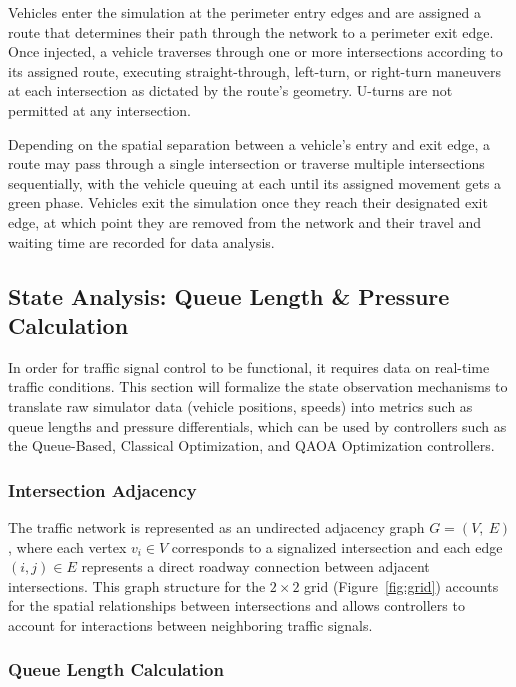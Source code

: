 \documentclass[12pt]{article}
\begin{document}
Vehicles enter the simulation at the perimeter entry edges and are assigned a route that determines their path through the network to a perimeter exit edge. Once injected, a vehicle traverses through one or more intersections according to its assigned route, executing straight-through, left-turn, or right-turn maneuvers at each intersection as dictated by the route's geometry. U-turns are not permitted at any intersection.

Depending on the spatial separation between a vehicle's entry and exit edge, a route may pass through a single intersection or traverse multiple intersections sequentially, with the vehicle queuing at each until its assigned movement gets a green phase. Vehicles exit the simulation once they reach their designated exit edge, at which point they are removed from the network and their travel and waiting time are recorded for data analysis.

\subsection{State Analysis: Queue Length \& Pressure Calculation}

In order for traffic signal control to be functional, it requires data on real-time traffic conditions. This section will formalize the state observation mechanisms to translate raw simulator data (vehicle positions, speeds) into metrics such as queue lengths and pressure differentials, which can be used by controllers such as the Queue-Based, Classical Optimization, and QAOA Optimization controllers.

\subsubsection{Intersection Adjacency}

The traffic network is represented as an undirected adjacency graph \(G = (V,\ E)\), where each vertex \(v_{i} \in V\) corresponds to a signalized intersection and each edge \((i,j) \in E\) represents a direct roadway connection between adjacent intersections. This graph structure for the $2 \times 2$ grid (Figure~\ref{fig:grid}) accounts for the spatial relationships between intersections and allows controllers to account for interactions between neighboring traffic signals.

\subsubsection{Queue Length Calculation}
\end{document}

